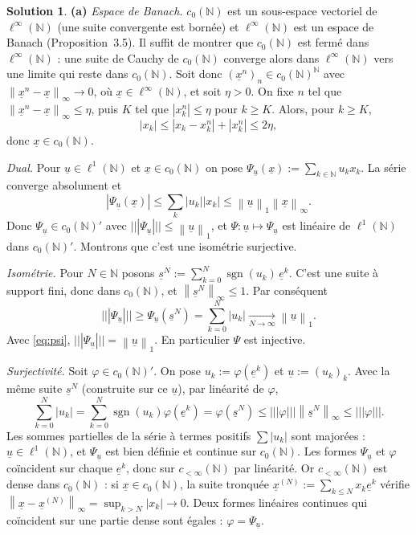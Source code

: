 \documentclass[11pt,a4paper]{article}
\newcommand{\N}{\mathbb{N}}
\newcommand{\norm}[1]{\left\|#1\right\|}
\newcommand{\opnorm}[1]{|\!|\!|#1|\!|\!|}
\DeclareMathOperator{\sgn}{sgn}
\theoremstyle{definition}
\newtheorem*{solution}{Solution}
\newcommand{\su}[1]{\underline{#1}}
\newcommand{\linf}{\ell^\infty(\N)}
\newcommand{\lun}{\ell^1(\N)}
\newcommand{\cz}{c_0(\N)}
\begin{document}
\begin{solution}
\noindent\textbf{(a)} \emph{Espace de Banach.} $\cz$ est un sous-espace vectoriel de $\linf$ (une suite convergente est bornée) et $\linf$ est un espace de Banach (Proposition~3.5). Il suffit de montrer que $\cz$ est fermé dans $\linf$ : une suite de Cauchy de $\cz$ converge alors dans $\linf$ vers une limite qui reste dans $\cz$. Soit donc $(\su x^n)_n\in\cz^\N$ avec $\norm{\su x^n-\su x}_\infty\to0$, où $\su x\in\linf$, et soit $\eta>0$. On fixe $n$ tel que $\norm{\su x^n-\su x}_\infty\le\eta$, puis $K$ tel que $|x^n_k|\le\eta$ pour $k\ge K$. Alors, pour $k\ge K$,
\[
  |x_k|\le|x_k-x^n_k|+|x^n_k|\le2\eta,
\]
donc $\su x\in\cz$.

\emph{Dual.} Pour $\su u\in\lun$ et $\su x\in\cz$ on pose $\Psi_{\su u}(\su x):=\sum_{k\in\N}u_kx_k$. La série converge absolument et
\begin{equation}\label{eq:psi}
  |\Psi_{\su u}(\su x)|\le\sum_k|u_k||x_k|\le\norm{\su u}_1\norm{\su x}_\infty .
\end{equation}
Donc $\Psi_{\su u}\in\cz'$ avec $\opnorm{\Psi_{\su u}}\le\norm{\su u}_1$, et $\Psi:\su u\mapsto\Psi_{\su u}$ est linéaire de $\lun$ dans $\cz'$. Montrons que c'est une isométrie surjective.

\emph{Isométrie.} Pour $N\in\N$ posons $\su s^N:=\sum_{k=0}^N\sgn(u_k)\,\su e^k$. C'est une suite à support fini, donc dans $\cz$, et $\norm{\su s^N}_\infty\le1$. Par conséquent
\[
  \opnorm{\Psi_{\su u}}\ge\Psi_{\su u}(\su s^N)=\sum_{k=0}^N|u_k|\xrightarrow[N\to\infty]{}\norm{\su u}_1 .
\]
Avec \eqref{eq:psi}, $\opnorm{\Psi_{\su u}}=\norm{\su u}_1$. En particulier $\Psi$ est injective.

\emph{Surjectivité.} Soit $\varphi\in\cz'$. On pose $u_k:=\varphi(\su e^k)$ et $\su u:=(u_k)_k$. Avec la même suite $\su s^N$ (construite sur ce $\su u$), par linéarité de $\varphi$,
\[
  \sum_{k=0}^N|u_k|=\sum_{k=0}^N\sgn(u_k)\varphi(\su e^k)=\varphi(\su s^N)\le\opnorm\varphi\norm{\su s^N}_\infty\le\opnorm\varphi .
\]
Les sommes partielles de la série à termes positifs $\sum|u_k|$ sont majorées : $\su u\in\lun$, et $\Psi_{\su u}$ est bien définie et continue sur $\cz$. Les formes $\Psi_{\su u}$ et $\varphi$ coïncident sur chaque $\su e^k$, donc sur $c_{<\infty}(\N)$ par linéarité. Or $c_{<\infty}(\N)$ est dense dans $\cz$ : si $\su x\in\cz$, la suite tronquée $\su x^{(N)}:=\sum_{k\le N}x_k\su e^k$ vérifie $\norm{\su x-\su x^{(N)}}_\infty=\sup_{k>N}|x_k|\to0$. Deux formes linéaires continues qui coïncident sur une partie dense sont égales : $\varphi=\Psi_{\su u}$.


\end{solution}
\end{document}
